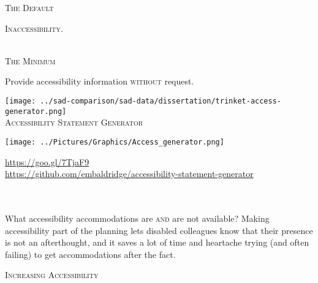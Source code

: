 \documentclass{beamer}
\begin{document}
\begin{center}
\begin{minipage}{0.25\linewidth}
\begin{Large}
\textsc{The Default}
\begin{center}
\textsc{Inaccessibility.}\\
~\\
\end{center}
\end{Large}
\begin{Large}
\textsc{The Minimum}\\
\end{Large}
Provide accessibility information \textsc{without} request.\\
\begin{center}
\texttt{[image: ../sad-comparison/sad-data/dissertation/trinket-access-generator.png]}\\
\textsc{Accessibility Statement Generator}
\end{center}
\begin{minipage}{0.3\textwidth}
\begin{small}
\texttt{[image: ../Pictures/Graphics/Access\_generator.png]} 
\end{small}
\end{minipage}
\begin{minipage}{0.67\textwidth}
\begin{small}
\url{https://goo.gl/7TjaF9}\\
\url{https://github.com/embaldridge/accessibility-statement-generator}\\
\end{small}
\end{minipage}
~\\
~\\
What accessibility accommodations are \textsc{and} are not available?  Making accessibility part of the planning lets disabled colleagues know that their presence is not an afterthought, and it saves a lot of time and heartache trying (and often failing) to get accommodations after the fact.\\
\end{minipage}
\hspace{1cm}
\begin{minipage}{0.42\linewidth}
\vspace{0.5cm}
\begin{center}
\begin{huge}
\textsc{Increasing Accessibility\\}
\end{huge}
\end{center}
~\\

\end{minipage}
\end{center}
\end{document}
